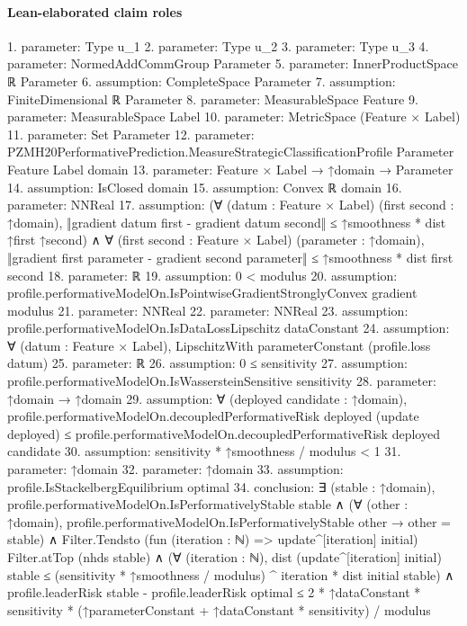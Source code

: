 \documentclass[10pt]{article}
\begin{document}
\paragraph{Lean-elaborated claim roles}\begin{ReviewVerbatim}
1. parameter: Type u_1
2. parameter: Type u_2
3. parameter: Type u_3
4. parameter: NormedAddCommGroup Parameter
5. parameter: InnerProductSpace ℝ Parameter
6. assumption: CompleteSpace Parameter
7. assumption: FiniteDimensional ℝ Parameter
8. parameter: MeasurableSpace Feature
9. parameter: MeasurableSpace Label
10. parameter: MetricSpace (Feature × Label)
11. parameter: Set Parameter
12. parameter: PZMH20PerformativePrediction.MeasureStrategicClassificationProfile Parameter Feature Label domain
13. parameter: Feature × Label → ↑domain → Parameter
14. assumption: IsClosed domain
15. assumption: Convex ℝ domain
16. parameter: NNReal
17. assumption: (∀ (datum : Feature × Label) (first second : ↑domain),
    ‖gradient datum first - gradient datum second‖ ≤ ↑smoothness * dist ↑first ↑second) ∧
  ∀ (first second : Feature × Label) (parameter : ↑domain),
    ‖gradient first parameter - gradient second parameter‖ ≤ ↑smoothness * dist first second
18. parameter: ℝ
19. assumption: 0 < modulus
20. assumption: profile.performativeModelOn.IsPointwiseGradientStronglyConvex gradient modulus
21. parameter: NNReal
22. parameter: NNReal
23. assumption: profile.performativeModelOn.IsDataLossLipschitz dataConstant
24. assumption: ∀ (datum : Feature × Label), LipschitzWith parameterConstant (profile.loss datum)
25. parameter: ℝ
26. assumption: 0 ≤ sensitivity
27. assumption: profile.performativeModelOn.IsWassersteinSensitive sensitivity
28. parameter: ↑domain → ↑domain
29. assumption: ∀ (deployed candidate : ↑domain),
  profile.performativeModelOn.decoupledPerformativeRisk deployed (update deployed) ≤
    profile.performativeModelOn.decoupledPerformativeRisk deployed candidate
30. assumption: sensitivity * ↑smoothness / modulus < 1
31. parameter: ↑domain
32. parameter: ↑domain
33. assumption: profile.IsStackelbergEquilibrium optimal
34. conclusion: ∃ (stable : ↑domain),
  profile.performativeModelOn.IsPerformativelyStable stable ∧
    (∀ (other : ↑domain), profile.performativeModelOn.IsPerformativelyStable other → other = stable) ∧
      Filter.Tendsto (fun (iteration : ℕ) => update^[iteration] initial) Filter.atTop (nhds stable) ∧
        (∀ (iteration : ℕ),
            dist (update^[iteration] initial) stable ≤
              (sensitivity * ↑smoothness / modulus) ^ iteration * dist initial stable) ∧
          profile.leaderRisk stable - profile.leaderRisk optimal ≤
            2 * ↑dataConstant * sensitivity * (↑parameterConstant + ↑dataConstant * sensitivity) / modulus
\end{ReviewVerbatim}
\end{document}
